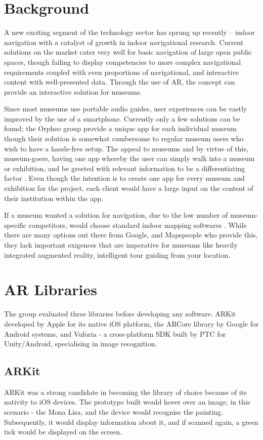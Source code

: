 \section{Background}
A new exciting segment of the technology sector has sprung up recently – indoor navigation with a catalyst of growth in indoor navigational research. Current solutions on the market cater very well for basic navigation of large open public spaces, though failing to display competencies to more complex navigational requirements coupled with even proportions of navigational, and interactive content with well-presented data. Through the use of AR, the concept can provide an interactive solution for museums.

Since most museums use portable audio guides, user experiences can be vastly improved by the use of a smartphone. Currently only a few solutions can be found; the Orpheo group provide a unique app for each individual museum though their solution is somewhat cumbersome to regular museum users who wish to have a hassle-free setup. The appeal to museums and by virtue of this, museum-goers, having one app whereby the user can simply walk into a museum or exhibition, and be greeted with relevant information to be a differentiating factor \cite{microsoft}. Even though the intention is to create one app for every museum and exhibition for the project, each client would have a large input on the content of their institution within the app. 

If a museum wanted a solution for navigation, due to the low number of museum-specific competitors, would choose standard indoor mapping softwares \cite{murphy}. While there are many options out there from Google, and Mapspeople \cite{mapspeople} who provide this, they lack important exigences that are imperative for museums like heavily integrated augmented reality, intelligent tour guiding from your location.

\section{AR Libraries}
The group evaluated three libraries before developing any software. ARKit developed by Apple for its native iOS platform, the ARCore library by Google for Android systems, and Vuforia - a cross-platform SDK built by PTC for Unity/Android, specialising in image recognition.

\subsection{ARKit}
ARKit was a strong candidate in becoming the library of choice because of its nativity to iOS devices. The prototype built would hover over an image, in this scenario - the Mona Lisa, and the device would recognise the painting. Subsequently, it would display information about it, and if scanned again, a green tick would be displayed on the screen.

